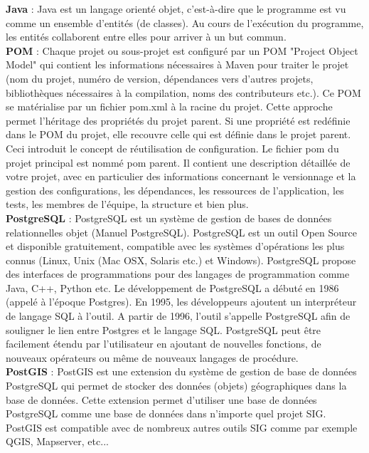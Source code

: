 \textbf{Java} : Java est un langage orienté objet, c'est-à-dire que le programme est vu comme un ensemble d'entités (de classes). Au cours de l'exécution du programme, les entités collaborent entre elles pour arriver à un but commun.\\

\textbf{POM} : Chaque projet ou sous-projet est configuré par un POM "Project Object Model" qui contient les informations nécessaires à Maven pour traiter le projet (nom du projet, numéro de version, dépendances vers d'autres projets, bibliothèques nécessaires à la compilation, noms des contributeurs etc.). Ce POM se matérialise par un fichier pom.xml à la racine du projet. Cette approche permet l'héritage des propriétés du projet parent. Si une propriété est redéfinie dans le POM du projet, elle recouvre celle qui est définie dans le projet parent. Ceci introduit le concept de réutilisation de configuration. Le fichier pom du projet principal est nommé pom parent. Il contient une description détaillée de votre projet, avec en particulier des informations concernant le versionnage et la gestion des configurations, les dépendances, les ressources de l'application, les tests, les membres de l'équipe, la structure et bien plus.\\

\textbf{PostgreSQL} : PostgreSQL est un système de gestion de bases de données relationnelles objet (Manuel PostgreSQL). PostgreSQL est un outil Open Source et disponible gratuitement, compatible avec les systèmes d'opérations les plus connus (Linux, Unix (Mac OSX, Solaris etc.) et Windows). PostgreSQL propose des interfaces de programmations pour des langages de programmation comme Java, C++, Python etc.
Le développement de PostgreSQL a débuté en 1986 (appelé à l'époque Postgres). En 1995, les développeurs ajoutent un interpréteur de langage SQL à l'outil. A partir de 1996, l'outil s'appelle PostgreSQL afin de souligner le lien entre Postgres et le langage SQL. PostgreSQL peut être facilement étendu par l'utilisateur en ajoutant de nouvelles fonctions, de nouveaux opérateurs ou même de nouveaux langages de procédure.\\

\textbf{PostGIS}\label{Postgis} : PostGIS est une extension du système de gestion de base de données PostgreSQL qui permet de stocker des données (objets) géographiques dans la base de données. Cette extension permet d'utiliser une base de données PostgreSQL comme une base de données dans n'importe quel projet SIG. PostGIS est compatible avec de nombreux autres outils SIG comme par exemple QGIS, Mapserver, etc...\\

